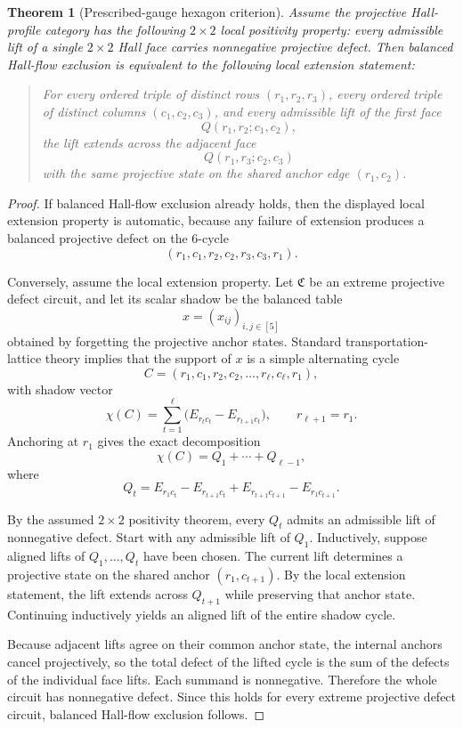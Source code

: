 \documentclass[11pt]{article}
\newtheorem{theorem}{Theorem}[section]
\theoremstyle{definition}
\newcommand{\1}{\mathbf{1}}
\begin{document}
\begin{theorem}[Prescribed-gauge hexagon criterion]\label{thm:555-hexagon-criterion}
Assume the projective Hall-profile category has the following $2\times 2$ local positivity property: every admissible lift of a single $2\times 2$ Hall face carries nonnegative projective defect. Then balanced Hall-flow exclusion is equivalent to the following local extension statement:

\begin{quote}
For every ordered triple of distinct rows $(r_1,r_2,r_3)$, every ordered triple of distinct columns $(c_1,c_2,c_3)$, and every admissible lift of the first face
\[
Q(r_1,r_2;c_1,c_2),
\]
the lift extends across the adjacent face
\[
Q(r_1,r_3;c_2,c_3)
\]
with the same projective state on the shared anchor edge $(r_1,c_2)$.
\end{quote}
\end{theorem}

\begin{proof}
If balanced Hall-flow exclusion already holds, then the displayed local extension property is automatic, because any failure of extension produces a balanced projective defect on the $6$-cycle
\[
(r_1,c_1,r_2,c_2,r_3,c_3,r_1).
\]

Conversely, assume the local extension property. Let $\mathfrak C$ be an extreme projective defect circuit, and let its scalar shadow be the balanced table
\[
x=(x_{ij})_{i,j\in[5]}
\]
obtained by forgetting the projective anchor states. Standard transportation-lattice theory implies that the support of $x$ is a simple alternating cycle
\[
C=(r_1,c_1,r_2,c_2,\dots,r_\ell,c_\ell,r_1),
\]
with shadow vector
\[
\chi(C)=\sum_{t=1}^{\ell}\bigl(E_{r_t c_t}-E_{r_{t+1}c_t}\bigr),
\qquad r_{\ell+1}=r_1.
\]
Anchoring at $r_1$ gives the exact decomposition
\[
\chi(C)=Q_1+\cdots+Q_{\ell-1},
\]
where
\[
Q_t=
E_{r_1c_t}-E_{r_{t+1}c_t}+E_{r_{t+1}c_{t+1}}-E_{r_1c_{t+1}}.
\]

By the assumed $2\times 2$ positivity theorem, every $Q_t$ admits an admissible lift of nonnegative defect. Start with any admissible lift of $Q_1$. Inductively, suppose aligned lifts of $Q_1,\dots,Q_t$ have been chosen. The current lift determines a projective state on the shared anchor $(r_1,c_{t+1})$. By the local extension statement, the lift extends across $Q_{t+1}$ while preserving that anchor state. Continuing inductively yields an aligned lift of the entire shadow cycle.

Because adjacent lifts agree on their common anchor state, the internal anchors cancel projectively, so the total defect of the lifted cycle is the sum of the defects of the individual face lifts. Each summand is nonnegative. Therefore the whole circuit has nonnegative defect. Since this holds for every extreme projective defect circuit, balanced Hall-flow exclusion follows.
\end{proof}
\end{document}
